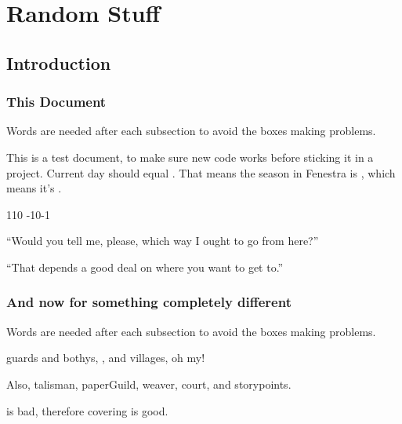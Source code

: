 \documentclass[a4paper,openany]{book}
\date{\today}
\begin{document}
\frontmatter

\chapter{Random Stuff}

\section{Introduction}

\begin{multicols}{2}

\subsection{This Document}
Words are needed after each subsection to avoid the boxes making problems.



This is a test document, to make sure new code works before sticking it in a project.
Current day should equal .
That means the season in Fenestra is \showCycle, which means it's \showTemperature.

%
  {{1}{1}{0}}%
  {{-1}{0}{-1}}%
  {%
    \spear
    \partialchain
  }%
  {}%
  {\lootMedium}%
  {}%



\begin{speechtext}

  ``Would you tell me, please, which way I ought to go from here?''

  ``That depends a good deal on where you want to get to.''

\end{speechtext}

\subsection{And now for something completely different}
Words are needed after each subsection to avoid the boxes making problems.



\Glspl{guard} and \glspl{bothy}, , and \glspl{village}, oh my!

Also, \gls{talisman}, \gls{paperGuild}, \gls{weaver}, \gls{court}, and \glspl{storypoint}.

 is bad, therefore \gls{covering} is good.


\end{multicols}
\end{document}

